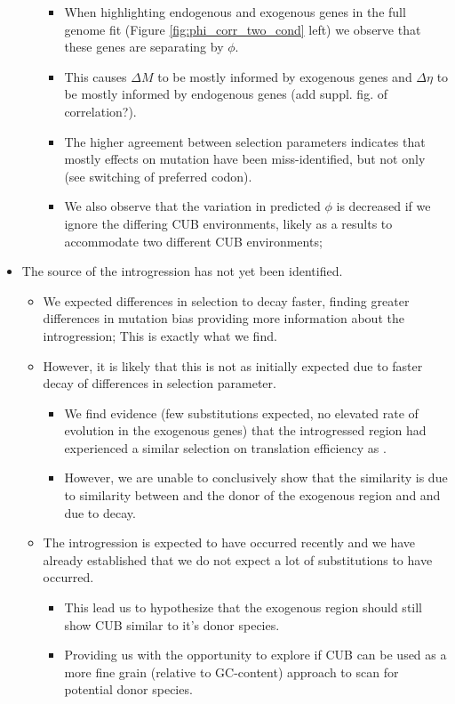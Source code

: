 \documentclass[12pt]{article}
\begin{document}
\begin{itemize}
\begin{itemize}
\begin{itemize}
			\item When highlighting endogenous and exogenous genes in the full genome fit (Figure \ref{fig:phi_corr_two_cond} left) we observe that these genes are separating by $\phi$.
			\item This causes $\Delta M$ to be mostly informed by exogenous genes and $\Delta \eta$ to be mostly informed by endogenous genes (add suppl. fig. of correlation?).
			\item The higher agreement between selection parameters indicates that mostly effects on mutation have been miss-identified, but not only (see switching of preferred codon).
			\item We also observe that the variation in predicted $\phi$ is decreased if we ignore the differing CUB environments, likely as a results to accommodate two different CUB environments;
		\end{itemize}
	\end{itemize}
	\item The source of the introgression has not yet been identified.
	\begin{itemize}
		\item We expected differences in selection to decay faster, finding greater differences in mutation bias providing more information about the introgression; This is exactly what we find.
		\item However, it is likely that this is not as initially expected due to faster decay of differences in selection parameter.
		\begin{itemize}
			\item We find evidence (few substitutions expected, no elevated rate of evolution in the exogenous genes) that the introgressed region had experienced a similar selection on translation efficiency as \kluyveri.
			\item However, we are unable to conclusively show that the similarity is due to similarity between \kluyveri and the donor of the exogenous region and and due to decay.
		\end{itemize}
		\item The introgression is expected to have occurred recently and we have already established that we do not expect a lot of substitutions to have occurred.
		\begin{itemize}
			\item This lead us to hypothesize that the exogenous region should still show CUB similar to it's donor species.
			\item Providing us with the opportunity to explore if CUB can be used as a more fine grain (relative to GC-content) approach to scan for potential donor species.

\end{itemize}
\end{itemize}
\end{itemize}
\end{document}
